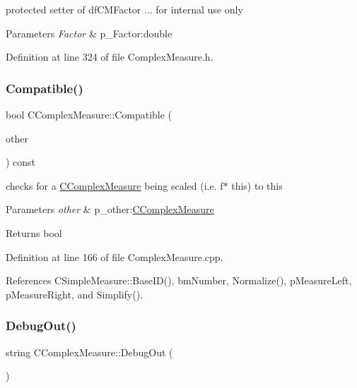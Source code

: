 protected setter of df\+C\+M\+Factor ... for internal use only 


\begin{DoxyParams}{Parameters}
{\em Factor} & p\+\_\+\+Factor\+:double \\
\hline
\end{DoxyParams}


Definition at line 324 of file Complex\+Measure.\+h.

\mbox{\label{classCComplexMeasure_aa807816cc8d410ff08e482c5e942a1a9}} 
\subsubsection{\texorpdfstring{Compatible()}{Compatible()}}
{\footnotesize\ttfamily bool C\+Complex\+Measure\+::\+Compatible (\begin{DoxyParamCaption}\item[{const \hyperlink{classCComplexMeasure}{C\+Complex\+Measure} \&}]{other }\end{DoxyParamCaption}) const}



checks for a \hyperlink{classCComplexMeasure}{C\+Complex\+Measure} being scaled (i.\+e. f$\ast$ this) to this 


\begin{DoxyParams}{Parameters}
{\em other} & p\+\_\+other\+:\hyperlink{classCComplexMeasure}{C\+Complex\+Measure} \\
\hline
\end{DoxyParams}
\begin{DoxyReturn}{Returns}
bool 
\end{DoxyReturn}


Definition at line 166 of file Complex\+Measure.\+cpp.



References C\+Simple\+Measure\+::\+Base\+I\+D(), bm\+Number, Normalize(), p\+Measure\+Left, p\+Measure\+Right, and Simplify().

\mbox{\label{classCComplexMeasure_a83c00029eaad1c0c59fd1210108981dc}} 
\subsubsection{\texorpdfstring{Debug\+Out()}{DebugOut()}}
{\footnotesize\ttfamily string C\+Complex\+Measure\+::\+Debug\+Out (\begin{DoxyParamCaption}{ }\end{DoxyParamCaption})}



